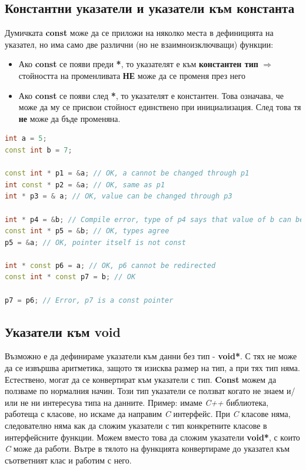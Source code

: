 \documentclass[fleqn,12pt]{article}
\begin{document}
\subsection{Константни указатели и указатели към константа}
Думичката \textbf{const} може да се приложи на няколко места в дефиницията на указател, но има само две различни (но не взаимноизключващи) функции:
\begin{itemize}
    \item Ако \textbf{const} се появи преди \textbf{*}, то указателят е към \textbf{константен тип} $\Rightarrow$ стойността на променливата \textbf{НЕ} може да се променя през него
    \item Ако \textbf{const} се появи след \textbf{*}, то указателят е константен. Това означава, че може да му се присвои стойност единствено при инициализация. След това тя \textbf{не} може да бъде променяна.
\end{itemize}

\begin{lstlisting}[language=C++, caption=Multidimensional pointers 2]
int a = 5;
const int b = 7;

const int * p1 = &a; // OK, a cannot be changed through p1
int const * p2 = &a; // OK, same as p1
int * p3 = & a; // OK, value can be changed through p3

int * p4 = &b; // Compile error, type of p4 says that value of b can be changed through it, but b is const
const int * p5 = &b; // OK, types agree
p5 = &a; // OK, pointer itself is not const

int * const p6 = a; // OK, p6 cannot be redirected
const int * const p7 = b; // OK

p7 = p6; // Error, p7 is a const pointer
\end{lstlisting}

\subsection{Указатели към void}
Възможно е да дефинираме указатели към данни без тип - \textbf{void*}. С тях не може да се извършва аритметика, защото тя изисква размер на тип, 
а при тях тип няма. Естествено, могат да се конвертират към указатели с тип. \textbf{Const} можем да ползваме по нормалния начин.
Този тип указатели се ползват когато не знаем и/или не ни интересува типа на данните. Пример: имаме \textit{C++} библиотека, работеща с класове,
но искаме да направим \textit{C} интерфейс. При \textit{C} класове няма, следователно няма как да сложим указатели с тип конкретните класове
в интерфейсните функции. Можем вместо това да сложим указатели \textbf{void*}, с които \textit{C} може да работи. Вътре в тялото на функцията
конвертираме до указател към съответният клас и работим с него.
\end{document}

